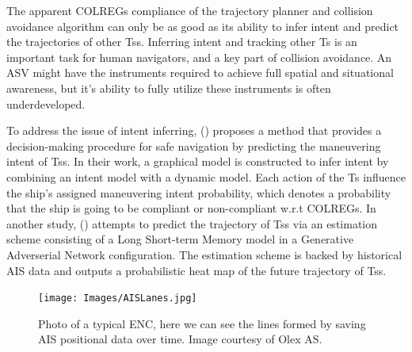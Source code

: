 The apparent \gls{COLREGs} compliance of the trajectory planner and collision avoidance algorithm can only be as 
good as its ability to infer intent and predict the trajectories of other \gls{Ts}s. 
Inferring intent and tracking other \gls{Ts} is an important task for human navigators, and a key part of collision avoidance.
An \gls{ASV} might have the instruments required to achieve full spatial and situational awareness, but it's ability to
fully utilize these instruments is often underdeveloped.


To address the issue of intent inferring, (\cite{cho2018intent}) proposes a method that provides a decision-making procedure
for safe navigation by predicting the maneuvering intent of \gls{Ts}s. In their work, a graphical model is constructed to infer intent by
combining an intent model with a dynamic model. Each action of the \gls{Ts} influence the ship's assigned maneuvering intent probability,
which denotes a probability that the ship is going to be compliant or non-compliant w.r.t \gls{COLREGs}.
In another study, (\cite{scholler2021trajectory}) attempts to predict the trajectory of \gls{Ts}s via an estimation scheme consisting
of a Long Short-term Memory model in a Generative Adverserial Network configuration. The estimation scheme is backed by historical \gls{AIS} data
and outputs a probabilistic heat map of the future trajectory of \gls{Ts}s.

\begin{figure}[ht!]
    \texttt{[image: Images/AISLanes.jpg]}
    \centering
    \caption{Photo of a typical ENC, here we can see the lines formed by saving AIS positional data over time. Image courtesy of Olex AS.}
    \label{FIG: AIS lanes}
\end{figure}



